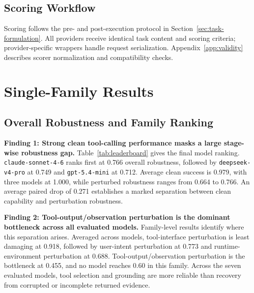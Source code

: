 \documentclass[11pt]{article}
\begin{document}
\subsection{Scoring Workflow}

Scoring follows the pre- and post-execution protocol in Section~\ref{sec:task-formulation}. All providers receive identical task content and scoring criteria; provider-specific wrappers handle request serialization. Appendix~\ref{app:validity} describes scorer normalization and compatibility checks.

\section{Single-Family Results}

\subsection{Overall Robustness and Family Ranking}

\noindent\textbf{Finding 1: Strong clean tool-calling performance masks a large stage-wise robustness gap.}
Table~\ref{tab:leaderboard} gives the final model ranking. \texttt{claude-sonnet-4-6} ranks first at 0.766 overall robustness, followed by \texttt{deepseek-v4-pro} at 0.749 and \texttt{gpt-5.4-mini} at 0.712. Average clean success is 0.979, with three models at 1.000, while perturbed robustness ranges from 0.664 to 0.766. An average paired drop of 0.271 establishes a marked separation between clean capability and perturbation robustness.

\noindent\textbf{Finding 2: Tool-output/observation perturbation is the dominant bottleneck across all evaluated models.}
Family-level results identify where this separation arises. Averaged across models, tool-interface perturbation is least damaging at 0.918, followed by user-intent perturbation at 0.773 and runtime-environment perturbation at 0.688. Tool-output/observation perturbation is the bottleneck at 0.455, and no model reaches 0.60 in this family. Across the seven evaluated models, tool selection and grounding are more reliable than recovery from corrupted or incomplete returned evidence.
\end{document}
